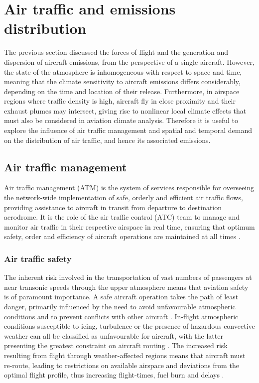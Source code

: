 \section{Air traffic and emissions distribution}
The previous section discussed the forces of flight and the generation and dispersion of aircraft emissions, from the perspective of a single aircraft. However, the state of the atmosphere is inhomogeneous with respect to space and time, meaning that the climate sensitivity to aircraft emissions differs considerably, depending on the time and location of their release. Furthermore, in airspace regions where traffic density is high, aircraft fly in close proximity and their exhaust plumes may intersect, giving rise to nonlinear local climate effects that must also be considered in aviation climate analysis. Therefore it is useful to explore the influence of air traffic management and spatial and temporal demand on the distribution of air traffic, and hence its associated emissions. 

\subsection{Air traffic management}
Air traffic management (ATM) is the system of services responsible for overseeing the network-wide implementation of safe, orderly and efficient air traffic flows, providing assistance to aircraft in transit from departure to destination aerodrome. It is the role of the air traffic control (ATC) team to manage and monitor air traffic in their respective airspace in real time, ensuring that optimum safety, order and efficiency of aircraft operations are maintained at all times \cite{SecretariatGeneral2016}. 


\subsubsection{Air traffic safety} 
The inherent risk involved in the transportation of vast numbers of passengers at near transonic speeds through the upper atmosphere means that aviation safety is of paramount importance. A safe aircraft operation takes the path of least danger, primarily influenced by the need to avoid unfavourable atmospheric conditions and to prevent conflicts with other aircraft \cite{Zhang2012, Baumgartner2007}. In-flight atmospheric conditions susceptible to icing, turbulence or the presence of hazardous convective weather can all be classified as unfavourable for aircraft, with the latter presenting the greatest constraint on aircraft routing \cite{Mitchell2006, Krozel2007}. The increased risk resulting from flight through weather-affected regions means that aircraft must re-route, leading to restrictions on available airspace and deviations from the optimal flight profile, thus increasing flight-times, fuel burn and delays \cite{weather_delay_2021}.

